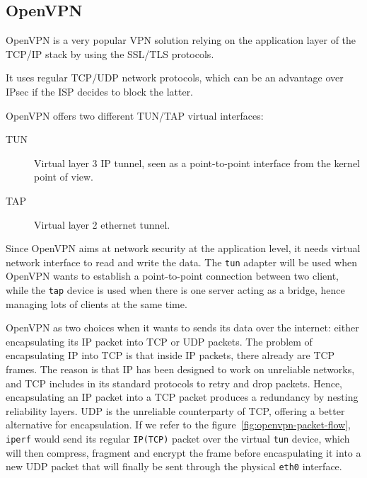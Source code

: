 \subsection{OpenVPN}
OpenVPN is a very popular VPN solution relying on the application layer of the TCP/IP stack by using the SSL/TLS protocols.

It uses regular TCP/UDP network protocols, which can be an advantage over IPsec if the ISP decides to block the latter.

OpenVPN offers two different TUN/TAP virtual interfaces:
\begin{description}
	\item[TUN] Virtual layer 3 IP tunnel, seen as a point-to-point interface from the kernel point of view.
	\item[TAP] Virtual layer 2 ethernet tunnel.
\end{description}

Since OpenVPN aims at network security at the application level, it needs virtual network interface to read and write the data.
The \texttt{tun} adapter will be used when OpenVPN wants to establish a point-to-point connection between two client, while the \texttt{tap} device is used when there is one server acting as a bridge, hence managing lots of clients at the same time.

OpenVPN as two choices when it wants to sends its data over the internet: either encapsulating its IP packet into TCP or UDP packets.
The problem of encapsulating IP into TCP is that inside IP packets, there already are TCP frames.
The reason is that IP has been designed to work on unreliable networks, and TCP includes in its standard protocols to retry and drop packets.
Hence, encapsulating an IP packet into a TCP packet produces a redundancy by nesting reliability layers.
UDP is the unreliable counterparty of TCP, offering a better alternative for encapsulation.
If we refer to the figure~\ref{fig:openvpn-packet-flow}, \texttt{iperf} would send its regular \texttt{IP(TCP)} packet over the virtual \texttt{tun} device, which will then compress, fragment and encrypt the frame before encaspulating it into a new UDP packet that will finally be sent through the physical \texttt{eth0} interface.

